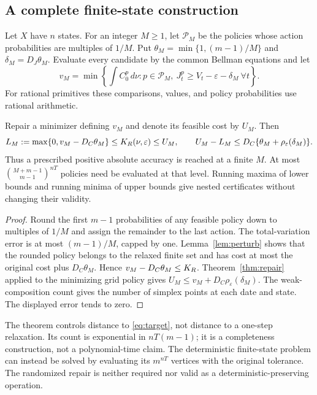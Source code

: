 \subsection{A complete finite-state construction}\label{sec:lattice}
Let $X$ have $n$ states. For an integer $M\geq1$, let $\mathcal P_M$ be the policies whose action probabilities are multiples of $1/M$. Put $\theta_M=\min\{1,(m-1)/M\}$ and $\delta_M=D_J\theta_M$. Evaluate every candidate by the common Bellman equations and let
\[
 v_M=\min\left\{\int C_0^p\,d\nu:p\in\mathcal P_M,\
 J_t^p\geq V_t-\varepsilon-\delta_M\ \forall t\right\}.
\]
For rational primitives these comparisons, values, and policy probabilities use rational arithmetic.

\begin{theorem}\label{thm:lattice}
Repair a minimizer defining $v_M$ and denote its feasible cost by $U_M$. Then
\begin{equation}\label{eq:latticebracket}
 L_M:=\max\{0,v_M-D_C\theta_M\}\leq K_R(\nu,\varepsilon)\leq U_M,
 \qquad U_M-L_M\leq D_C\{\theta_M+\rho_\varepsilon(\delta_M)\}.
\end{equation}
Thus a prescribed positive absolute accuracy is reached at a finite $M$. At most
$\binom{M+m-1}{m-1}^{nT}$ policies need be evaluated at that level. Running maxima of lower bounds and running minima of upper bounds give nested certificates without changing their validity.
\end{theorem}
\begin{proof}
Round the first $m-1$ probabilities of any feasible policy down to multiples of $1/M$ and assign the remainder to the last action. The total-variation error is at most $(m-1)/M$, capped by one. Lemma~\ref{lem:perturb} shows that the rounded policy belongs to the relaxed finite set and has cost at most the original cost plus $D_C\theta_M$. Hence $v_M-D_C\theta_M\leq K_R$. Theorem~\ref{thm:repair} applied to the minimizing grid policy gives $U_M\leq v_M+D_C\rho_\varepsilon(\delta_M)$. The weak-composition count gives the number of simplex points at each date and state. The displayed error tends to zero.
\end{proof}

The theorem controls distance to \eqref{eq:target}, not distance to a one-step relaxation. Its count is exponential in $nT(m-1)$; it is a completeness construction, not a polynomial-time claim. The deterministic finite-state problem can instead be solved by evaluating its $m^{nT}$ vertices with the original tolerance. The randomized repair is neither required nor valid as a deterministic-preserving operation.

